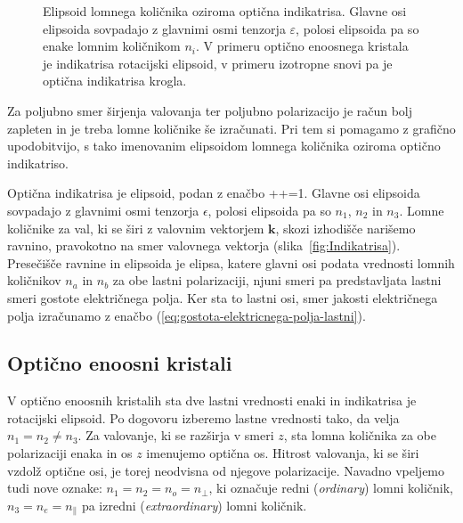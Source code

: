 \begin{figure}[h]
\centering
\def\svgwidth{40truemm} 

\caption{Elipsoid lomnega količnika oziroma optična indikatrisa. Glavne osi
elipsoida sovpadajo z glavnimi osmi tenzorja $\varepsilon$, polosi elipsoida pa so enake
lomnim količnikom $n_i$. V primeru optično enoosnega kristala je indikatrisa  
rotacijski elipsoid, v primeru izotropne snovi pa je optična indikatrisa krogla.}
\label{Indikatrisa}
\end{figure}

Za poljubno smer širjenja valovanja ter poljubno polarizacijo je račun
bolj zapleten in je treba lomne količnike še izračunati. Pri tem si pomagamo 
z grafično upodobitvijo, s tako imenovanim elipsoidom lomnega količnika oziroma
optično indikatriso. 

Optična indikatrisa je elipsoid, podan z enačbo
\beq
{}++=1.
\eeq
Glavne osi elipsoida sovpadajo z glavnimi osmi tenzorja $\epsilon$, 
polosi elipsoida pa so $n_{1}$, $n_{2}$ in $n_{3}$. 
Lomne količnike za val, ki se širi z valovnim vektorjem $\mathbf{k}$, skozi izhodišče
narišemo ravnino, pravokotno na smer valovnega vektorja (slika~\ref{fig:Indikatrisa}).
Presečišče ravnine in elipsoida je elipsa, katere glavni osi podata
vrednosti lomnih količnikov $n_{a}$ in $n_{b}$ za obe lastni polarizaciji,
njuni smeri pa predstavljata lastni smeri gostote električnega polja. Ker
sta to lastni osi, smer jakosti električnega polja izračunamo z
enačbo (\ref{eq:gostota-elektricnega-polja-lastni}).

\subsection*{Optično enoosni kristali}
V optično enoosnih kristalih sta dve lastni vrednosti enaki in indikatrisa je rotacijski 
elipsoid. Po dogovoru izberemo lastne vrednosti tako, da velja $n_{1}=n_{2}\neq n_{3}$. 
Za valovanje, ki se razširja v smeri $z$, sta lomna količnika za obe polarizaciji 
enaka in os $z$ imenujemo optična os. Hitrost valovanja, ki
se širi vzdolž optične osi, je torej neodvisna od njegove polarizacije.
Navadno vpeljemo tudi nove oznake: $n_{1}=n_{2}=n_{o}=n_{\perp}$, ki označuje redni (\textit{ordinary})
lomni količnik, $n_{3}=n_{e}=n_\parallel$ pa izredni 
(\textit{extraordinary}) lomni količnik. 

